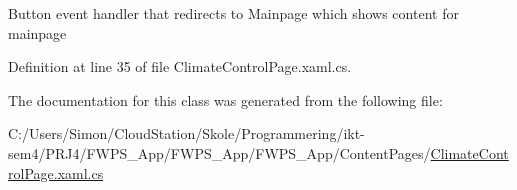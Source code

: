 Button event handler that redirects to Mainpage which shows content for mainpage 

Definition at line 35 of file Climate\+Control\+Page.\+xaml.\+cs.



The documentation for this class was generated from the following file\+:\begin{DoxyCompactItemize}
\item 
C\+:/\+Users/\+Simon/\+Cloud\+Station/\+Skole/\+Programmering/ikt-\/sem4/\+P\+R\+J4/\+F\+W\+P\+S\+\_\+\+App/\+F\+W\+P\+S\+\_\+\+App/\+F\+W\+P\+S\+\_\+\+App/\+Content\+Pages/\mbox{\hyperlink{_climate_control_page_8xaml_8cs}{Climate\+Control\+Page.\+xaml.\+cs}}\end{DoxyCompactItemize}
